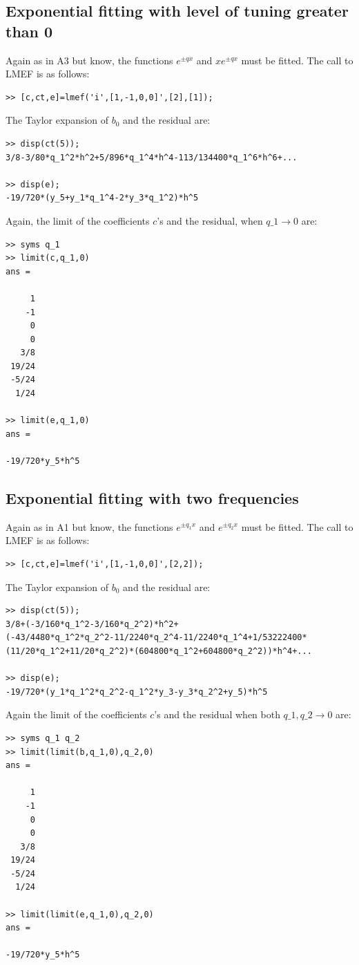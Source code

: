 \documentclass[acmtoms,acmnow]{acmtrans2m}
\begin{document}
\subsection{Exponential fitting with level of tuning greater than 0}
Again as in A3 but know, the functions $e^{\pm qx}$ and $xe^{\pm
qx}$ must be fitted. The call to LMEF is as follows:
\begin{verbatim}
>> [c,ct,e]=lmef('i',[1,-1,0,0]',[2],[1]);
\end{verbatim}
The Taylor expansion of $b_0$ and the residual are:
\begin{verbatim}
>> disp(ct(5));
3/8-3/80*q_1^2*h^2+5/896*q_1^4*h^4-113/134400*q_1^6*h^6+...

>> disp(e);
-19/720*(y_5+y_1*q_1^4-2*y_3*q_1^2)*h^5
\end{verbatim}
Again, the limit of the coefficients $c$'s and the residual, when
$q\_1 \rightarrow 0$ are:
\begin{verbatim}
>> syms q_1
>> limit(c,q_1,0)
ans =

     1
    -1
     0
     0
   3/8
 19/24
 -5/24
  1/24

>> limit(e,q_1,0)
ans =

-19/720*y_5*h^5
\end{verbatim}

\subsection{Exponential fitting with two frequencies}
Again as in A1 but know, the functions $e^{\pm q_1 x}$ and $e^{\pm
q_2 x}$ must be fitted. The call to LMEF is as follows:
\begin{verbatim}
>> [c,ct,e]=lmef('i',[1,-1,0,0]',[2,2]);
\end{verbatim}
The Taylor expansion of $b_0$ and the residual are:
\begin{verbatim}
>> disp(ct(5));
3/8+(-3/160*q_1^2-3/160*q_2^2)*h^2+
(-43/4480*q_1^2*q_2^2-11/2240*q_2^4-11/2240*q_1^4+1/53222400*
(11/20*q_1^2+11/20*q_2^2)*(604800*q_1^2+604800*q_2^2))*h^4+...

>> disp(e);
-19/720*(y_1*q_1^2*q_2^2-q_1^2*y_3-y_3*q_2^2+y_5)*h^5
\end{verbatim}
Again the limit of the coefficients $c$'s and the residual when
both $q\_1,q\_2 \rightarrow 0$ are:
\begin{verbatim}
>> syms q_1 q_2
>> limit(limit(b,q_1,0),q_2,0)
ans =

     1
    -1
     0
     0
   3/8
 19/24
 -5/24
  1/24

>> limit(limit(e,q_1,0),q_2,0)
ans =

-19/720*y_5*h^5
\end{verbatim}
\end{document}
